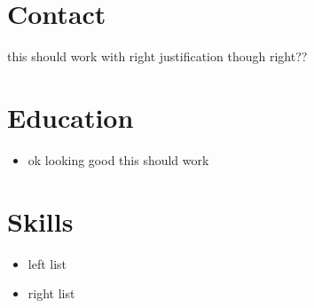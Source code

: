 \documentclass[11pt]{article}
\begin{document}

\bighsep[1pt]

\begin{multicols}{3}
    \section*{Contact}
    \begin{flushright}
    this should work with right justification though right??
    \end{flushright}
    \columnbreak

    \section*{Education}
    \begin{itemize} \itemsep -0pt
        \item ok looking good this should work
    \end{itemize}
    \columnbreak

    \section*{Skills} 
    \begin{multicols}{2}
        \begin{itemize} \itemsep -0pt
            \item left list
        \end{itemize} \itemsep -0pt

        \begin{itemize}
            \item right list
        \end{itemize}
    \end{multicols}
\end{multicols}

\hsep[1pt]
\end{document}
